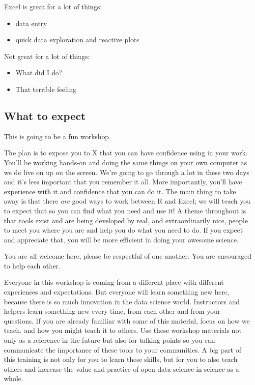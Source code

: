 \documentclass[]{book}
\providecommand{\tightlist}{%
  \setlength{\itemsep}{0pt}\setlength{\parskip}{0pt}}
\begin{document}
Excel is great for a lot of things:

\begin{itemize}
\tightlist
\item
  data entry
\item
  quick data exploration and reactive plots
\end{itemize}

Not great for a lot of things:

\begin{itemize}
\tightlist
\item
  What did I do?
\item
  That terrible feeling
\end{itemize}

\hypertarget{what-to-expect}{%
\subsection{What to expect}\label{what-to-expect}}

This is going to be a fun workshop.

The plan is to expose you to X that you can have confidence using in your work. You'll be working hands-on and doing the same things on your own computer as we do live on up on the screen. We're going to go through a lot in these two days and it's less important that you remember it all. More importantly, you'll have experience with it and confidence that you can do it. The main thing to take away is that there \emph{are} good ways to work between R and Excel; we will teach you to expect that so you can find what you need and use it! A theme throughout is that tools exist and are being developed by real, and extraordinarily nice, people to meet you where you are and help you do what you need to do. If you expect and appreciate that, you will be more efficient in doing your awesome science.

You are all welcome here, please be respectful of one another. You are encouraged to help each other.

Everyone in this workshop is coming from a different place with different experiences and expectations. But everyone will learn something new here, because there is so much innovation in the data science world. Instructors and helpers learn something new every time, from each other and from your questions. If you are already familiar with some of this material, focus on how we teach, and how you might teach it to others. Use these workshop materials not only as a reference in the future but also for talking points so you can communicate the importance of these tools to your communities. A big part of this training is not only for you to learn these skills, but for you to also teach others and increase the value and practice of open data science in science as a whole.
\end{document}
